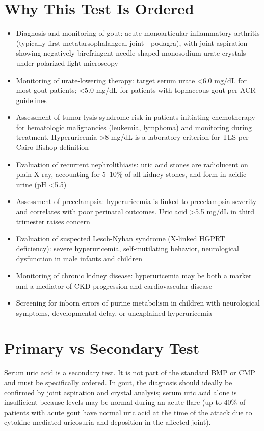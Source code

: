 \section*{Why This Test Is Ordered}
\begin{itemize}
  \item Diagnosis and monitoring of gout: acute monoarticular inflammatory arthritis (typically first metatarsophalangeal joint---podagra), with joint aspiration showing negatively birefringent needle-shaped monosodium urate crystals under polarized light microscopy
  \item Monitoring of urate-lowering therapy: target serum urate <6.0 mg/dL for most gout patients; <5.0 mg/dL for patients with tophaceous gout per ACR guidelines
  \item Assessment of tumor lysis syndrome risk in patients initiating chemotherapy for hematologic malignancies (leukemia, lymphoma) and monitoring during treatment. Hyperuricemia >8 mg/dL is a laboratory criterion for TLS per Cairo-Bishop definition
  \item Evaluation of recurrent nephrolithiasis: uric acid stones are radiolucent on plain X-ray, accounting for 5--10\% of all kidney stones, and form in acidic urine (pH <5.5)
  \item Assessment of preeclampsia: hyperuricemia is linked to preeclampsia severity and correlates with poor perinatal outcomes. Uric acid >5.5 mg/dL in third trimester raises concern
  \item Evaluation of suspected Lesch-Nyhan syndrome (X-linked HGPRT deficiency): severe hyperuricemia, self-mutilating behavior, neurological dysfunction in male infants and children
  \item Monitoring of chronic kidney disease: hyperuricemia may be both a marker and a mediator of CKD progression and cardiovascular disease
  \item Screening for inborn errors of purine metabolism in children with neurological symptoms, developmental delay, or unexplained hyperuricemia
\end{itemize}

\section*{Primary vs Secondary Test}
Serum uric acid is a secondary test. It is not part of the standard BMP or CMP and must be specifically ordered. In gout, the diagnosis should ideally be confirmed by joint aspiration and crystal analysis; serum uric acid alone is insufficient because levels may be normal during an acute flare (up to 40\% of patients with acute gout have normal uric acid at the time of the attack due to cytokine-mediated uricosuria and deposition in the affected joint).

